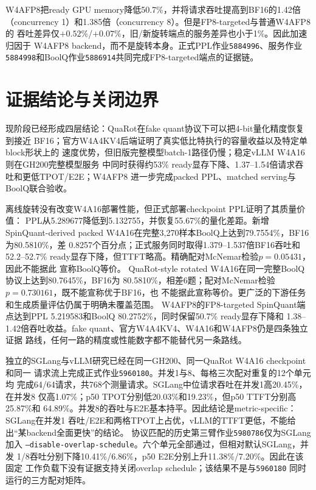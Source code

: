 \documentclass[11pt,a4paper]{ctexart}
\begin{document}
W4AFP8把ready GPU memory降低50.7\%，并将请求吞吐提高到BF16的1.42倍
（concurrency 1）和1.385倍（concurrency 8）。但是FP8-targeted与普通W4AFP8的
吞吐差异仅$+0.52\%$/$+0.07\%$，旧/新旋转端点的服务差异也小于1\%。因此加速归因于
W4AFP8 backend，而不是旋转本身。正式PPL作业\texttt{5884996}、服务作业
\texttt{5884998}和BoolQ作业\texttt{5886914}共同完成FP8-targeted端点的证据链。

\section*{证据结论与关闭边界}

现阶段已经形成四层结论：QuaRot在fake quant协议下可以把4-bit量化精度恢复到接近
BF16；官方W4A4KV4后端证明了真实低比特执行的容量收益以及特定单block形状上的
速度优势，但旧版完整模型batch-1路径仍慢；稳定vLLM W4A16则在GH200完整模型服务
中同时获得约53\% ready显存下降、1.37--1.54倍请求吞吐和更低TPOT/E2E；W4AFP8
进一步完成packed PPL、matched serving与BoolQ联合验收。

离线旋转没有改变W4A16部署性能，但正式部署checkpoint PPL证明了其质量价值：
PPL从5.289677降低到5.132755，并恢复55.67\%的量化差距。新增SpinQuant-derived
packed W4A16在完整3,270样本BoolQ上达到79.7554\%，BF16为80.5810\%，差
0.8257个百分点；正式服务同时取得1.379--1.537倍BF16吞吐和52.2--52.7\%
ready显存下降，但TTFT略高。精确配对McNemar检验$p=0.05431$，因此不能据此
宣称BoolQ等价。
QuaRot-style rotated W4A16在同一完整BoolQ协议上达到80.7645\%，BF16为
80.5810\%，相差6题；配对McNemar检验$p=0.730161$，既不能宣称优于BF16，也
不能据此宣称等价。更广泛的下游任务和生成质量评估仍属于明确未覆盖范围。
W4AFP8的FP8-targeted
SpinQuant端点达到PPL 5.219583和BoolQ 80.2752\%，同时保留50.7\% ready显存下降和
1.38--1.42倍吞吐收益。fake quant、官方W4A4KV4、W4A16和W4AFP8仍是四条独立证据
路线，任何一路的精度或性能数字都不能替代另一条路线。

独立的SGLang与vLLM研究已经在同一GH200、同一QuaRot W4A16 checkpoint和同一
请求流上完成正式作业\texttt{5960180}。并发1与8、每格三次配对重复的12个单元均
完成64/64请求，共768个测量请求。SGLang中位请求吞吐在并发1高20.45\%，在并发8
仅高1.07\%；p50 TPOT分别低20.03\%和19.23\%，但p50 TTFT分别高25.87\%和
64.89\%。并发8的吞吐与E2E基本持平。因此结论是metric-specific：SGLang在并发1
吞吐/E2E和两格TPOT上占优，vLLM的TTFT更低，不能给出“某backend全面更快”的结论。
协议匹配的历史第三臂作业\texttt{5980786}仅为SGLang加入
\texttt{--disable-overlap-schedule}。六个单元全部通过，但相对默认SGLang，并发
1/8吞吐分别下降10.41\%/6.86\%，p50 E2E分别上升11.38\%/7.20\%。因此在该固定
工作负载下没有证据支持关闭overlap schedule；该结果不是与\texttt{5960180}
同时运行的三方配对矩阵。
\end{document}
